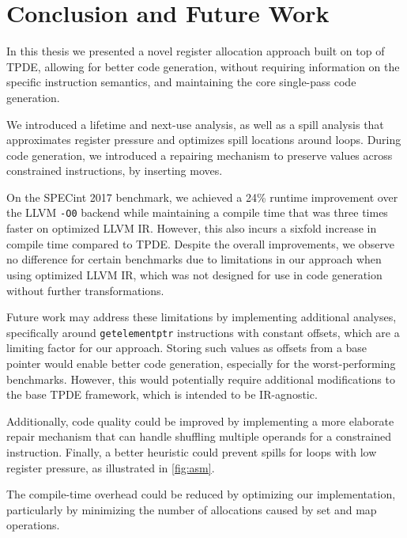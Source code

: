 

\chapter{Conclusion and Future Work}\label{chapter:conclusion}

In this thesis we presented a novel register allocation approach built on top of TPDE, allowing for better code generation, without requiring information on the specific instruction semantics, and maintaining the core single-pass code generation.

We introduced a lifetime and next-use analysis, as well as a spill analysis that approximates register pressure and optimizes spill locations around loops. During code generation, we introduced a repairing mechanism to preserve values across constrained instructions, by inserting moves.


On the SPECint 2017 benchmark, we achieved a 24\% runtime improvement over the LLVM \texttt{-O0} backend while maintaining a compile time that was three times faster on optimized LLVM IR. However, this also incurs a sixfold increase in compile time compared to TPDE. Despite the overall improvements, we observe no difference for certain benchmarks due to limitations in our approach when using optimized LLVM IR, which was not designed for use in code generation without further transformations.

Future work may address these limitations by implementing additional analyses, specifically around \texttt{getelementptr} instructions with constant offsets, which are a limiting factor for our approach. Storing such values as offsets from a base pointer would enable better code generation, especially for the worst-performing benchmarks. However, this would potentially require additional modifications to the base TPDE framework, which is intended to be IR-agnostic. 

Additionally, code quality could be improved by implementing a more elaborate repair mechanism that can handle shuffling multiple operands for a constrained instruction. Finally, a better heuristic could prevent spills for loops with low register pressure, as illustrated in \autoref{fig:asm}.

The compile-time overhead could be reduced by optimizing our implementation, particularly by minimizing the number of allocations caused by set and map operations.




